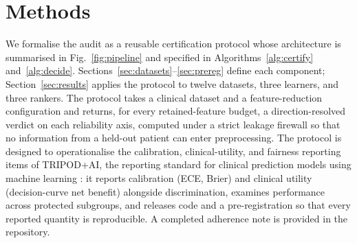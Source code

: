 \documentclass[fleqn,10pt]{wlscirep}
\begin{document}
\section{Methods}
\label{sec:methods}

We formalise the audit as a reusable certification protocol whose architecture is summarised in
Fig.~\ref{fig:pipeline} and specified in Algorithms~\ref{alg:certify} and~\ref{alg:decide}.
Sections~\ref{sec:datasets}--\ref{sec:prereg} define each component; Section~\ref{sec:results}
applies the protocol to twelve datasets, three learners, and three rankers. The protocol takes a
clinical dataset and a feature-reduction configuration and returns, for every retained-feature budget,
a direction-resolved verdict on each reliability axis, computed under a strict leakage firewall so
that no information from a held-out patient can enter preprocessing. The protocol is designed to
operationalise the calibration, clinical-utility, and fairness reporting items of TRIPOD+AI, the
reporting standard for clinical prediction models using machine learning \cite{collins2024tripod}:
it reports calibration (ECE, Brier) and clinical utility (decision-curve net benefit) alongside
discrimination, examines performance across protected subgroups, and releases code and a
pre-registration so that every reported quantity is reproducible. A completed adherence note is
provided in the repository.
\end{document}
